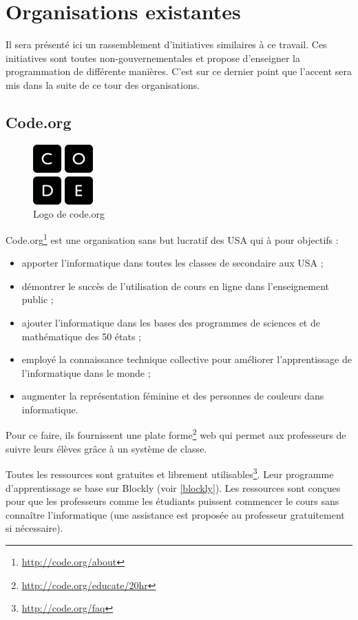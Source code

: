 \section{Organisations existantes}
Il sera présenté ici un rassemblement d'initiatives similaires à ce travail. Ces initiatives sont toutes non-gouvernementales et propose d'enseigner la programmation de différente manières. C'est sur ce dernier point que l'accent sera mis dans la suite de ce tour des organisations.
\subsection{Code.org}
\begin{figure}[!h]
  \begin{center}
    \includegraphics[scale=0.5]{content/5-related_work/images/code}
    \caption{Logo de code.org}
    \label{fig:code.org}
  \end{center}
\end{figure}
Code.org\footnote{\url{http://code.org/about}} est une organisation sans but lucratif des USA qui à pour objectifs :
\begin{itemize}
  \item apporter l'informatique dans toutes les classes de secondaire aux USA ;
  \item démontrer le succès de l'utilisation de cours en ligne dans l'enseignement public ;
  \item ajouter l'informatique dans les bases des programmes de sciences et de mathématique des 50 états ;
  \item employé la connaissance technique collective pour améliorer l'apprentissage de l'informatique dans le monde ;
  \item augmenter la représentation féminine et des personnes de couleurs dans informatique.
\end{itemize}

Pour ce faire, ils fournissent une plate forme\footnote{\url{http://code.org/educate/20hr}} web qui permet aux professeurs de suivre leurs élèves grâce à un système de classe.

Toutes les ressources sont gratuites et librement utilisables\footnote{\url{http://code.org/faq}}. Leur programme d'apprentissage se base sur Blockly (voir \ref{blockly}).
Les ressources sont conçues pour que les professeurs comme les étudiants puissent commencer le cours sans connaître l'informatique (une assistance est proposée au professeur gratuitement si nécessaire).


